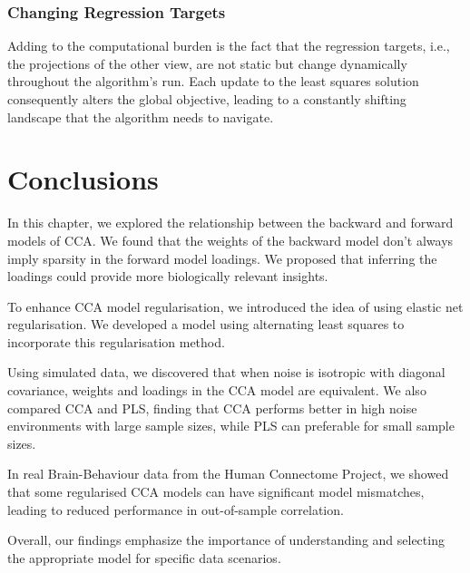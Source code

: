 \subsubsection{Changing Regression Targets}\label{subsec:changing-regression-targets}
Adding to the computational burden is the fact that the regression targets, i.e., the projections of the other view, are not static but change dynamically throughout the algorithm's run.
Each update to the least squares solution consequently alters the global objective, leading to a constantly shifting landscape that the algorithm needs to navigate.

\section{Conclusions}
In this chapter, we explored the relationship between the backward and forward models of CCA. We found that the weights of the backward model don't always imply sparsity in the forward model loadings. We proposed that inferring the loadings could provide more biologically relevant insights.

To enhance CCA model regularisation, we introduced the idea of using elastic net regularisation.
We developed a model using alternating least squares to incorporate this regularisation method.

Using simulated data, we discovered that when noise is isotropic with diagonal covariance, weights and loadings in the CCA model are equivalent.
We also compared CCA and PLS, finding that CCA performs better in high noise environments with large sample sizes,
while PLS can preferable for small sample sizes.

In real Brain-Behaviour data from the Human Connectome Project, we showed that some regularised CCA models can have significant model mismatches, leading to reduced performance in out-of-sample correlation.

Overall, our findings emphasize the importance of understanding and selecting the appropriate model for specific data scenarios.



